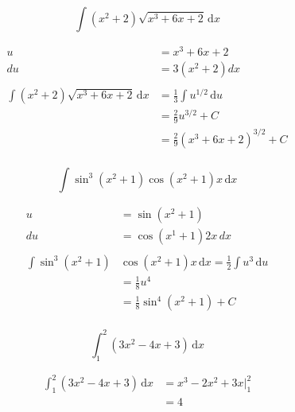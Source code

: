 \documentclass[fleqn,addpoints]{exam}
\begin{document}
\begin{questions}
\begin{solution}[5 cm]
\end{solution}

\question[7]
\[
  \int (x^2 + 2) \sqrt{x^3 + 6x + 2} \, \mathrm{d}x
\]

\begin{solution}[6 cm]

\begin{align*}
  u &= x^3 + 6x + 2 \\
  du &= 3(x^2 + 2) dx \\
\\
  \int (x^2 + 2) \sqrt{x^3 + 6x + 2} \, \mathrm{d}x &= \frac{1}{3} \int u^{1/2} \, \mathrm{d}u \\
  &= \frac{2}{9} u^{3/2} + C \\
  &= \frac{2}{9} (x^3 + 6x + 2)^{3/2} + C \\
\end{align*}

\end{solution}

\ifprintanswers
\pagebreak
\fi

\question[10]
\label{indefinite:last}
\[
  \int \sin^3(x^2 + 1) \cos(x^2 + 1) x  \, \mathrm{d}x
\]

\begin{solution}[7 cm]
\begin{align*}
  u &= \sin(x^2 + 1) \\
  du &= \cos(x^1 + 1) 2x \, dx \\
\\
  \int \sin^3(x^2 + 1) & \cos(x^2 + 1) x \, \mathrm{d}x = \frac{1}{2} \int u^3 \, \mathrm{d}u \\
  &= \frac{1}{8} u^4 \\
  &= \frac{1}{8} \sin^4(x^2 + 1) + C \\
\end{align*}

\end{solution}


 

\question[7]
\[
  \int_1^2 \left( 3x^2 - 4x + 3 \right)\, \mathrm{d}x
\]

\begin{solution}[8 cm]
\begin{align*}
  \int_1^2 \left( 3x^2 - 4x + 3 \right)\, \mathrm{d}x &= x^3 - 2x^2 + 3x \bigg|_1^2 \\
  &= 4 \\
\end{align*}
\end{solution}


\end{questions}
\end{document}
